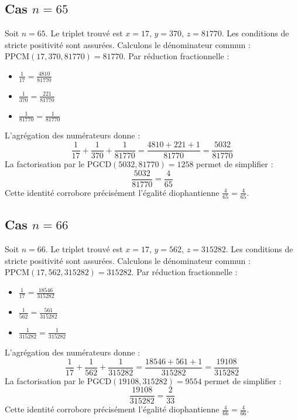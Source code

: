 \documentclass[11pt,a4paper]{article}
\begin{document}
\subsection{Cas $n = 65$}
Soit $n = 65$. Le triplet trouvé est $x = 17$, $y = 370$, $z = 81770$.
Les conditions de stricte positivité sont assurées.
Calculons le dénominateur commun : $\text{PPCM}(17, 370, 81770) = 81770$.
Par réduction fractionnelle :
\begin{itemize}
    \item $\frac{1}{17} = \frac{4810}{81770}$
    \item $\frac{1}{370} = \frac{221}{81770}$
    \item $\frac{1}{81770} = \frac{1}{81770}$
\end{itemize}
L'agrégation des numérateurs donne :
$$ \frac{1}{17} + \frac{1}{370} + \frac{1}{81770} = \frac{4810 + 221 + 1}{81770} = \frac{5032}{81770} $$
La factorisation par le $\text{PGCD}(5032, 81770) = 1258$ permet de simplifier :
$$ \frac{5032}{81770} = \frac{4}{65} $$
Cette identité corrobore précisément l'égalité diophantienne $\frac{4}{65} = \frac{4}{65}$.

\subsection{Cas $n = 66$}
Soit $n = 66$. Le triplet trouvé est $x = 17$, $y = 562$, $z = 315282$.
Les conditions de stricte positivité sont assurées.
Calculons le dénominateur commun : $\text{PPCM}(17, 562, 315282) = 315282$.
Par réduction fractionnelle :
\begin{itemize}
    \item $\frac{1}{17} = \frac{18546}{315282}$
    \item $\frac{1}{562} = \frac{561}{315282}$
    \item $\frac{1}{315282} = \frac{1}{315282}$
\end{itemize}
L'agrégation des numérateurs donne :
$$ \frac{1}{17} + \frac{1}{562} + \frac{1}{315282} = \frac{18546 + 561 + 1}{315282} = \frac{19108}{315282} $$
La factorisation par le $\text{PGCD}(19108, 315282) = 9554$ permet de simplifier :
$$ \frac{19108}{315282} = \frac{2}{33} $$
Cette identité corrobore précisément l'égalité diophantienne $\frac{4}{66} = \frac{4}{66}$.
\end{document}
